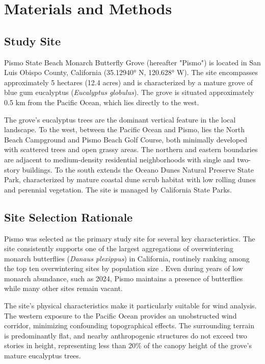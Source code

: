 \section{Materials and Methods}
\subsection{Study Site}
Pismo State Beach Monarch Butterfly Grove (hereafter "Pismo") is located in San Luis Obispo County, California (35.12940° N, 120.628° W). The site encompasses approximately 5 hectares (12.4 acres) and is characterized by a mature grove of blue gum eucalyptus (\textit{Eucalyptus globulus}). The grove is situated approximately 0.5 km from the Pacific Ocean, which lies directly to the west.

The grove's eucalyptus trees are the dominant vertical feature in the local landscape. To the west, between the Pacific Ocean and Pismo, lies the North Beach Campground and Pismo Beach Golf Course, both minimally developed with scattered trees and open grassy areas. The northern and eastern boundaries are adjacent to medium-density residential neighborhoods with single and two-story buildings. To the south extends the Oceano Dunes Natural Preserve State Park, characterized by mature coastal dune scrub habitat with low rolling dunes and perennial vegetation. The site is managed by California State Parks.


\subsection{Site Selection Rationale}
Pismo was selected as the primary study site for several key characteristics. The site consistently supports one of the largest aggregations of overwintering monarch butterflies (\textit{Danaus plexippus}) in California, routinely ranking among the top ten overwintering sites by population size \autocite{westernmonarchcount2023}. Even during years of low monarch abundance, such as 2024, Pismo maintains a presence of butterflies while many other sites remain vacant.

The site's physical characteristics make it particularly suitable for wind analysis. The western exposure to the Pacific Ocean provides an unobstructed wind corridor, minimizing confounding topographical effects. The surrounding terrain is predominantly flat, and nearby anthropogenic structures do not exceed two stories in height, representing less than 20\% of the canopy height of the grove's mature eucalyptus trees.

